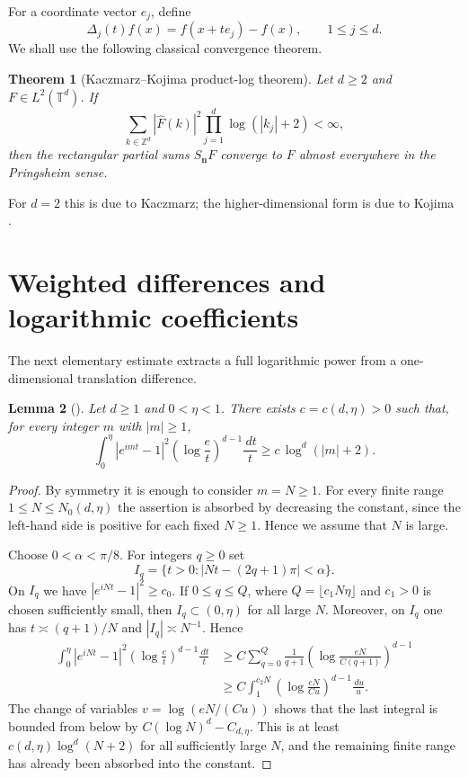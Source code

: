 \documentclass[11pt,reqno]{amsart}
\numberwithin{equation}{section}
\theoremstyle{plain}
\newtheorem{theorem}{Theorem}[section]
\newtheorem{lemma}[theorem]{Lemma}
\theoremstyle{definition}
\theoremstyle{remark}
\newcommand{\T}{\mathbb T}
\newcommand{\Z}{\mathbb Z}
\newcommand{\dd}{\,d}
\newcommand{\wh}{\widehat}
\newcommand{\abs}[1]{\left\lvert #1\right\rvert}
\begin{document}
For a coordinate vector $e_j$, define
\[
 \Delta_j(t)f(x)=f(x+te_j)-f(x),\qquad 1\le j\le d.
\]
We shall use the following classical convergence theorem.

\begin{theorem}[Kaczmarz--Kojima product-log theorem]\label{thm:KK}
Let $d\ge2$ and $F\in L^2(\T^d)$. If
\begin{equation}\label{eq:KK}
 \sum_{k\in\Z^d}\abs{\wh F(k)}^2\prod_{j=1}^d \log(\abs{k_j}+2)<\infty,
\end{equation}
then the rectangular partial sums $S_{\mathbf n}F$ converge to $F$ almost everywhere in the Pringsheim sense.
\end{theorem}

For $d=2$ this is due to Kaczmarz; the higher-dimensional form is due to Kojima \cite{Kaczmarz1930,Kojima1977}.

\section{Weighted differences and logarithmic coefficients}

The next elementary estimate extracts a full logarithmic power from a one-dimensional translation difference.

\begin{lemma}[]\label{lem:oscillation}
Let $d\ge1$ and $0<\eta<1$. There exists $c=c(d,\eta)>0$ such that, for every integer $m$ with $\abs{m}\ge1$,
\begin{equation}\label{eq:oscillation}
 \int_0^\eta \abs{e^{imt}-1}^2\left(\log\frac et\right)^{d-1}\frac{\dd t}{t}
 \ge c\,\log^d(\abs{m}+2).
\end{equation}
\end{lemma}

\begin{proof}
By symmetry it is enough to consider $m=N\ge1$. For every finite range $1\le N\le N_0(d,\eta)$ the assertion is absorbed by decreasing the constant, since the left-hand side is positive for each fixed $N\ge1$. Hence we assume that $N$ is large.

Choose $0<\alpha<\pi/8$. For integers $q\ge0$ set
\[
 I_q=\bigl\{t>0:\abs{Nt-(2q+1)\pi}<\alpha\bigr\}.
\]
On $I_q$ we have $\abs{e^{iNt}-1}^2\ge c_0$. If $0\le q\le Q$, where $Q=\lfloor c_1N\eta\rfloor$ and $c_1>0$ is chosen sufficiently small, then $I_q\subset(0,\eta)$ for all large $N$. Moreover, on $I_q$ one has $t\asymp(q+1)/N$ and $\abs{I_q}\asymp N^{-1}$. Hence
\begin{align*}
 \int_0^\eta \abs{e^{iNt}-1}^2\left(\log\frac et\right)^{d-1}\frac{\dd t}{t}
 &\ge C\sum_{q=0}^Q \frac1{q+1}
 \left(\log\frac{eN}{C(q+1)}\right)^{d-1}  \\
 &\ge C\int_1^{c_2N}\left(\log\frac{eN}{Cu}\right)^{d-1}\frac{\dd u}{u}.
\end{align*}
The change of variables $v=\log(eN/(Cu))$ shows that the last integral is bounded from below by $C(\log N)^d-C_{d,\eta}$. This is at least $c(d,\eta)\log^d(N+2)$ for all sufficiently large $N$, and the remaining finite range has already been absorbed into the constant.
\end{proof}
\end{document}
